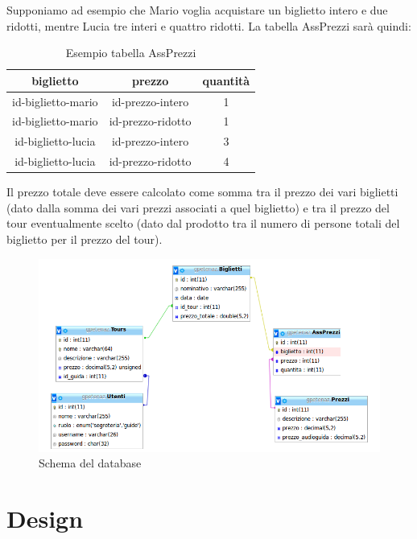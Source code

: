 \documentclass[10pt,a4paper,onecolumn]{article}
\begin{document}
Supponiamo ad esempio che Mario voglia acquistare un biglietto intero e due ridotti, mentre Lucia tre interi e quattro ridotti. La tabella AssPrezzi sarà quindi:
\begin{table}[H]
    \centering
    \begin{tabular}{ | c | c | c |}
        \hline
        \textbf{biglietto} & \textbf{prezzo} & \textbf{quantità} \\
        \hline
        id-biglietto-mario & id-prezzo-intero & 1 \\
        \hline
        id-biglietto-mario & id-prezzo-ridotto & 1 \\
        \hline
        id-biglietto-lucia & id-prezzo-intero & 3 \\
        \hline
        id-biglietto-lucia & id-prezzo-ridotto & 4 \\
        \hline
    \end{tabular}
    \caption{Esempio tabella AssPrezzi}
\end{table}

Il prezzo totale deve essere calcolato come somma tra il prezzo dei vari biglietti (dato dalla somma dei vari prezzi associati a quel biglietto) e tra il prezzo del tour eventualmente scelto (dato dal prodotto tra il numero di persone totali del biglietto per il prezzo del tour).
\begin{figure}[h!]
\centering
\includegraphics[scale=0.50]{db.png}
\caption{Schema del database}
\end{figure}

\clearpage
\section{Design}
\end{document}
